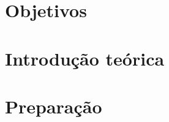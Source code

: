 \documentclass[a4paper,12pt,oneside,openany,table,xcdraw]{article}
\begin{document}
\newcommand{\thedepartment}{Faculdade de Engenharia Elétrica}
\newcommand{\thecourse}{FEELT}
\newcommand{\thetitle}{CIRCUITOS TRIFÁSICOS DESEQUILIBRADOS}
\newcommand{\thetype}{Relatório da Disciplina de Experimental de Circuitos Elétricos II}
\newcommand{\theproftitle}{Bacharel em Engenharia Elétrica}
\newcommand{\thestudent}{Lesly Viviane Montúfar Berrios\\
\centering11811ETE001}
\newcommand{\theadvisor}{Prof. Wellington Maycon Santos Bernardes}
\newcommand{\thecity}{Uberlândia}

\thispagestyle{empty}


\onehalfspacing
\tableofcontents %
\newpage

\section{Objetivos} %


\section{Introdução teórica} %


\section{Preparação}
\end{document}
